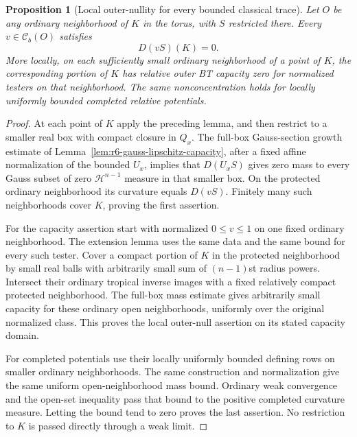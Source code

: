 \documentclass[11pt,a4paper]{article}
\numberwithin{equation}{section}
\newtheorem{proposition}[theorem]{Proposition}
\theoremstyle{definition}
\theoremstyle{remark}
\begin{document}
\begin{proposition}[Local outer-nullity for every bounded classical trace]
\label{prop:r6-local-gauss-nullity}
Let $O$ be any ordinary neighborhood of $K$ in the torus, with $S$
restricted there. Every $v\in\mathcal C_b(O)$ satisfies
\[
                              D(vS)(K)=0.
\]
More locally, on each sufficiently small ordinary neighborhood of a
point of $K$, the corresponding portion of $K$ has relative outer
BT capacity zero for normalized testers on that neighborhood.
The same nonconcentration holds for locally uniformly bounded
completed relative potentials.
\end{proposition}

\begin{proof}
At each point of $K$ apply the preceding lemma, and then restrict to
a smaller real box with compact closure in $Q_x$. The full-box
Gauss-section growth estimate of
Lemma~\ref{lem:r6-gauss-lipschitz-capacity}, after a fixed affine
normalization of the bounded $U_x$, implies that $D(U_xS)$ gives
zero mass to every Gauss subset of zero $\mathcal H^{n-1}$ measure
in that smaller box. On the protected ordinary neighborhood its
curvature equals $D(vS)$. Finitely many such neighborhoods cover
$K$, proving the first assertion.

For the capacity assertion start with normalized $0\le v\le1$ on
one fixed ordinary neighborhood. The extension lemma uses the same
data and the same bound for every such tester. Cover a compact
portion of $K$ in the protected neighborhood by small real balls
with arbitrarily small sum of $(n-1)$st radius powers. Intersect
their ordinary tropical inverse images with a fixed relatively
compact protected neighborhood. The full-box mass estimate gives
arbitrarily small capacity for these ordinary open neighborhoods,
uniformly over the original normalized class. This proves the local
outer-null assertion on its stated capacity domain.

For completed potentials use their locally uniformly bounded defining
rows on smaller ordinary neighborhoods. The same construction and
normalization give the same uniform open-neighborhood mass bound.
Ordinary weak convergence and the open-set inequality pass that
bound to the positive completed curvature measure. Letting the bound
tend to zero proves the last assertion. No restriction to $K$ is
passed directly through a weak limit.
\end{proof}
\end{document}
